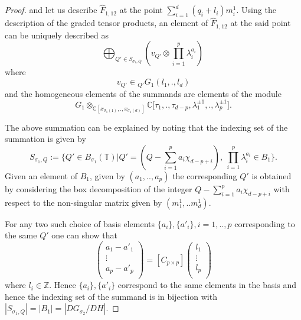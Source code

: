 \documentclass[10pt,a4paper]{amsart}
\begin{document}
\begin{proof}
and let us describe $\hat{F}_{1,12}$ at the point $\sum_{i=1}^{d}(q_i+l_i)m^1_i.$\newline
Using the description of the graded tensor products, an element of $\hat{F}_{1,12}$ at the said point can be uniquely described as $$\bigoplus_{Q'\in S_{\sigma_1,Q}}(v_{Q'}\otimes \prod_{i=1}^{p}\lambda_i^{a_i})\ $$ where $$v_{Q'}\in {}_{Q'}G_{1}(l_1,.,l_d)$$ and %
the homogeneous elements of the summands are elements of the module $$G_1\otimes_{\mathbb{C}[x_{\sigma_{1}(1)},.,x_{\sigma_{1}(d)}]} \mathbb{C}\bigg[\tau_1,.,\tau_{d-p},\lambda_{1}^{\pm 1},.,\lambda_{p}^{\pm 1}\bigg] .$$\par
The above summation can be explained by noting that the indexing set of the summation is given by
$$S_{\sigma_1,Q}:=\big \{Q'\in B_{\sigma_{1}}(\mathbb{T})\bigg|Q'=(Q-\sum_{i=1}^{p}a_{i}\chi_{d-p+i})  ,\ \prod_{i=1}^{p}\lambda_{i}^{a_i}\in B_1  \big \}.$$
Given an element of $B_1$, given by $(a_1,..,a_p)$ the corresponding $Q'$ is obtained by considering the box decomposition of the integer $Q-\sum_{i=1}^{p}a_{i}\chi_{d-p+i}$ with respect to the non-singular matrix given by $(m^1_1,..m^1_d).$\par For any two such choice of basis elements $\{a_i\},\{a'_i\},i=1,..,p$ corresponding to the same $Q'$ one can show that $$\begin{pmatrix}
  a_{1}-a'_{1} \\
  \vdots \\
  a_{p}-a'_p \\
\end{pmatrix}=[C_{p\times p}]\begin{pmatrix}
 l_1\\
 \vdots\\
 l_p\\
\end{pmatrix}$$ 
where $l_i \in \mathbb{Z}.$ Hence $\{a_i\},\{a'_i\}$ correspond to the same elements in the basis and hence the indexing set of the summand is in bijection with $|S_{\sigma_1,Q}|=|B_1|=|DG_{\sigma_2}/DH|.$


\end{proof}
\end{document}
